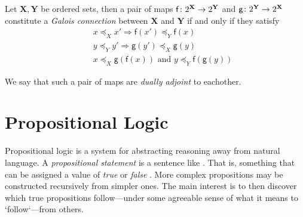 \begin{definition}
\label{definition:Galois-connection}
Let $\mathbf{X}, \mathbf{Y}$ be ordered sets, then a pair of maps $\mathsf{f} \colon 2^{\mathbf{X}} \to 2^{\mathbf{Y}}$ and $\mathsf{g} \colon 2^{\mathbf{Y}} \to 2^{\mathbf{X}}$ constitute a \emph{Galois connection} between $\mathbf{X}$ and $\mathbf{Y}$ if and only if they satisfy
\begin{align}
    \quad & x \preceq_X x' \Rightarrow \mathsf{f}(x') \preceq_Y \mathsf{f}(x) \\
    \quad & y \preceq_Y y' \Rightarrow \mathsf{g}(y') \preceq_X \mathsf{g}(y) \\
    \quad & x \preceq_X \mathsf{g}(\mathsf{f}(x)) \text{ and } y \preceq_Y \mathsf{f}(\mathsf{g}(y))
 \end{align}

 We say that such a pair of maps are \emph{dually adjoint} to eachother.
\end{definition}

\begin{figure}[H]
\centering
{}
\end{figure}




\section{Propositional Logic}
\label{section:propositional-logic}

Propositional logic is a system for abstracting reasoning away from natural language. A \textit{propositional statement} is a sentence like . That is, something that can be assigned a value of \textit{true} or \textit{false} \cite[p. 7]{Ben1993Mathematical}. More complex propositions may be constructed recursively from simpler ones. The main interest is to then discover which true propositions follow---under some agreeable sense of what it means to `follow`---from others.

